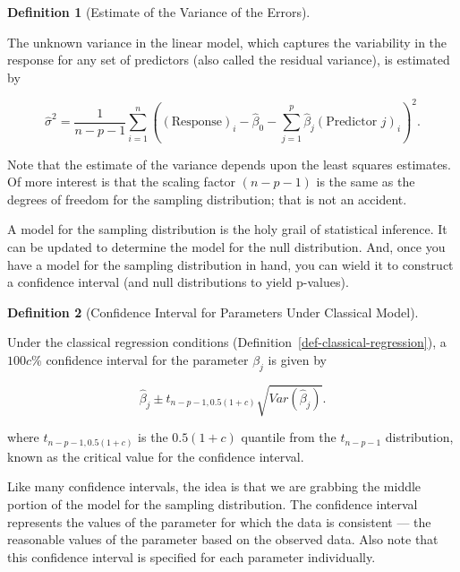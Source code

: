 \documentclass[
  letterpaper,
  DIV=11,
  numbers=noendperiod]{scrreprt}
\theoremstyle{definition}
\newtheorem{definition}{Definition}[chapter]
\theoremstyle{definition}
\theoremstyle{remark}
\begin{document}
\begin{definition}[Estimate of the Variance of the
Errors]\protect\hypertarget{def-estimate-sigma2}{}\label{def-estimate-sigma2}

The unknown variance in the linear model, which captures the variability
in the response for any set of predictors (also called the residual
variance), is estimated by

\[\widehat{\sigma}^2 = \frac{1}{n-p-1} \sum\limits_{i=1}^{n} \left((\text{Response})_i - \widehat{\beta}_0 - \sum\limits_{j=1}^{p} \widehat{\beta}_j (\text{Predictor } j)_{i}\right)^2.\]

\end{definition}

Note that the estimate of the variance depends upon the least squares
estimates. Of more interest is that the scaling factor \((n - p - 1)\)
is the same as the degrees of freedom for the sampling distribution;
that is not an accident.

A model for the sampling distribution is the holy grail of statistical
inference. It can be updated to determine the model for the null
distribution. And, once you have a model for the sampling distribution
in hand, you can wield it to construct a confidence interval (and null
distributions to yield p-values).

\begin{definition}[Confidence Interval for Parameters Under Classical
Model]\protect\hypertarget{def-classical-ci}{}\label{def-classical-ci}

Under the classical regression conditions
(Definition~\ref{def-classical-regression}), a \(100c\)\% confidence
interval for the parameter \(\beta_j\) is given by

\[\widehat{\beta}_j \pm t_{n-p-1, 0.5(1+c)} \sqrt{Var\left(\widehat{\beta}_j\right)}.\]

where \(t_{n-p-1, 0.5(1+c)}\) is the \(0.5(1+c)\) quantile from the
\(t_{n-p-1}\) distribution, known as the critical value for the
confidence interval.

\end{definition}

Like many confidence intervals, the idea is that we are grabbing the
middle portion of the model for the sampling distribution. The
confidence interval represents the values of the parameter for which the
data is consistent --- the reasonable values of the parameter based on
the observed data. Also note that this confidence interval is specified
for each parameter individually.
\end{document}
